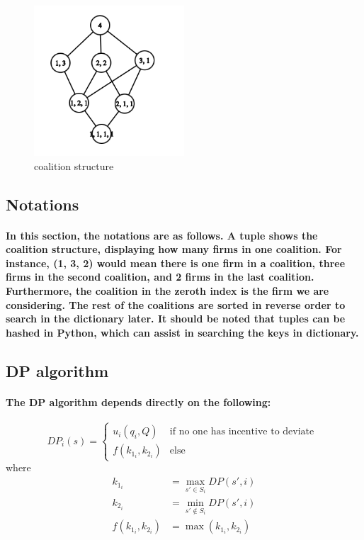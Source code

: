 \documentclass[11pt]{report}
\begin{document}
\begin{figure}[htbp]
	\centering
	\includegraphics[width=0.5\textwidth]{images/sym4.png}
	\caption{coalition structure}	
\end{figure}


\subsection{Notations}
\paragraph{In this section, the notations are as follows. A tuple shows the coalition structure, displaying how many firms in one coalition. For instance, (1, 3, 2) would mean there is one firm in a coalition,  three firms in the second coalition, and 2 firms in the last coalition. Furthermore, the coalition in the zeroth index is the firm we are considering. The rest of the coalitions are sorted in reverse order to search in the dictionary later. It should be noted that tuples can be hashed in Python, which can assist in searching the keys in dictionary.} 

\subsection{DP algorithm }
\paragraph{The DP algorithm depends directly on the following: }
\[
DP_i(s) = 
\begin{cases}

u_i(q_i, Q) &\text{if no one has incentive to deviate } \\
f(k_{1_i}, k_{2_i}) &\text{else}
\end{cases}
\]
where 
\[
\begin{align}
	k_{1_i} &= \max_{s'\in S_i} DP(s', i) \\
	k_{2_i} &= \min_{s'\notin S_i} DP(s', i) \\ 
	f(k_{1_i}, k_{2_i}) &= \max(k_{1_i}, k_{2_i}) 
\end{align}
\] 
\end{document}
